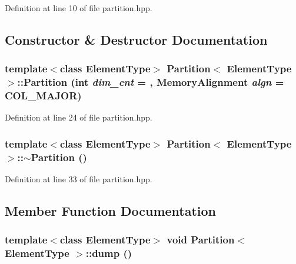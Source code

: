 Definition at line 10 of file partition.hpp.

\subsection{Constructor \& Destructor Documentation}
\hypertarget{class_partition_adbdfdfec715a01a053f5c6efeb4e10e3}{
\subsubsection[{Partition}]{\setlength{\rightskip}{0pt plus 5cm}template$<$class ElementType$>$ {\bf Partition}$<$ ElementType $>$::{\bf Partition} (int {\em dim\_\-cnt} = {}, \/  MemoryAlignment {\em algn} = {\ttfamily COL\_\-MAJOR})}}
\label{class_partition_adbdfdfec715a01a053f5c6efeb4e10e3}


Definition at line 24 of file partition.hpp.\hypertarget{class_partition_a5e6c9ebcc03fb273e0766abe77954813}{
\subsubsection[{$\sim$Partition}]{\setlength{\rightskip}{0pt plus 5cm}template$<$class ElementType$>$ {\bf Partition}$<$ ElementType $>$::$\sim${\bf Partition} ()}}
\label{class_partition_a5e6c9ebcc03fb273e0766abe77954813}


Definition at line 33 of file partition.hpp.

\subsection{Member Function Documentation}
\hypertarget{class_partition_aeabe76c45c274addb15c435f13c2c7e8}{
\subsubsection[{dump}]{\setlength{\rightskip}{0pt plus 5cm}template$<$class ElementType$>$ void {\bf Partition}$<$ ElementType $>$::dump ()}}
\label{class_partition_aeabe76c45c274addb15c435f13c2c7e8}


